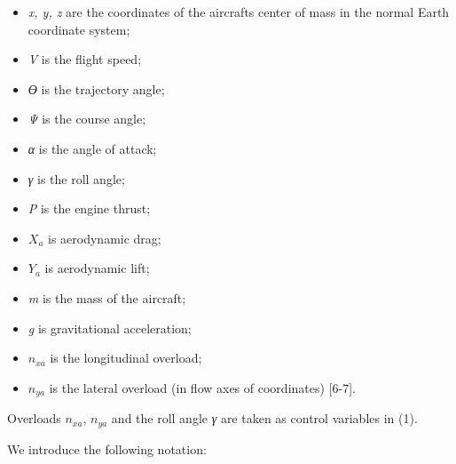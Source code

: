 \begin{itemize}
\item
  \emph{x, y, z} are the coordinates of the aircraft\textquotesingle s
  center of mass in the normal Earth coordinate system;
\item
  \emph{V} is the flight speed;
\item
  \emph{ϴ} is the trajectory angle;
\item
  \emph{Ψ} is the course angle;
\item
  \emph{α} is the angle of attack;
\item
  \emph{γ} is the roll angle;
\item
  \emph{P} is the engine thrust;
\item
  \(X_{a}\) is aerodynamic drag;
\item
  \(Y_{a}\) is aerodynamic lift;
\item
  \emph{m} is the mass of the aircraft;
\item
  \emph{g} is gravitational acceleration;
\item
  \(n_{xa}\) is the longitudinal overload;
\item
  \(n_{ya}\) is the lateral overload (in flow axes of coordinates)
  {[}6-7{]}.
\end{itemize}

Overloads \(n_{xa}\), \(n_{ya}\) and the roll angle \emph{γ} are taken
as control variables in (1).

We introduce the following notation:

